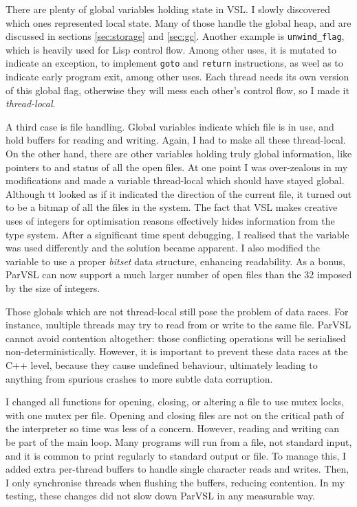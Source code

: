 There are plenty of global variables holding state in VSL. I slowly discovered which ones represented local
state. Many of those handle the global heap, and are discussed in sections \ref{sec:storage} and \ref{sec:gc}.
Another example is \verb|unwind_flag|, which is heavily used for Lisp control flow. Among other uses, it is
mutated to indicate an exception, to implement \verb|goto| and \verb|return| instructions,
as weel as to indicate early program exit,
among other uses. Each thread needs its own version of this global flag, otherwise they will mess each
other's control flow, so I made it \emph{thread-local}.

A third case is file handling. Global variables indicate which file is in use, and hold buffers for reading
and writing. Again, I had to make all these thread-local. On the other hand, there are other variables holding
truly global information, like pointers to and status of all the open files. At one point I was over-zealous in
my modifications and made a variable thread-local which should have stayed global. Although tt looked as if it indicated
the direction of the current file, it turned out to be a bitmap of all the files in the system. The fact
that VSL makes creative uses of integers for optimisation reasons effectively hides information from the type system.
After a significant time spent debugging, I realised that the variable was used differently and the solution became apparent.
I also modified the variable to use a proper \emph{bitset} data structure, enhancing readability.
As a bonus, ParVSL can now support a much larger number of open files than the 32 imposed by the size of integers.

Those globals which are not thread-local still pose the problem of data races. For instance, multiple threads
may try to read from or write to the same file. ParVSL cannot avoid contention altogether: those conflicting
operations will be serialised non-deterministically. However, it is important to prevent these data races at
the C++ level, because they cause undefined behaviour, ultimately leading to anything from spurious crashes
to more subtle data corruption.

I changed all functions for opening, closing, or altering a file to use mutex locks, with one mutex per file.
Opening and closing files are not on the critical path of the interpreter so time was less of a concern.
However, reading and writing can be part of the main loop. Many programs will run from a file, not standard input,
and it is common to print regularly to standard output or file. To manage this, I added extra per-thread buffers
to handle single character reads and writes. Then, I only synchronise threads when flushing the buffers, reducing
contention. In my testing, these changes did not slow down ParVSL in any measurable way.

